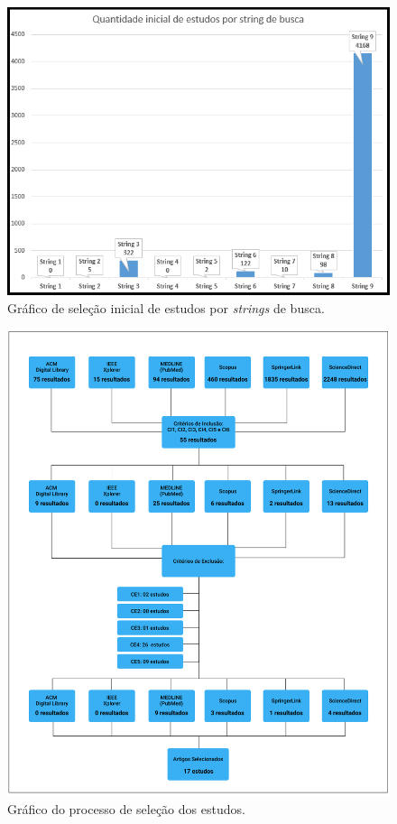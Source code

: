 \begin{figure}[htb]
	\caption{\label{fig_graficoSelecaoInicialEstudosStrings}Gráfico de seleção inicial de estudos por \textit{strings} de busca.}
	\begin{center}
	    \includegraphics[scale=0.63]{Imagens/grafico - selecao inicial de estudos por string.png}
	\end{center}
\end{figure}

\begin{figure}[htb]
	\caption{\label{fig_graficoProcessoInclusaoExclusaoArtigos}Gráfico do processo de seleção dos estudos.}
	\begin{center}
	    \includegraphics[scale=0.4]{Imagens/grafico - processo de selecao dos estudos.png}
	\end{center}
\end{figure}

